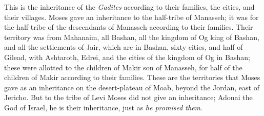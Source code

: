 \begin{biblechapter}
\verse This is the inheritance of the \textit{Gadites} according to their families, the cities, and their villages.
 Moses gave an inheritance to the half-tribe of Manasseh; it was for the half-tribe of the descendants of Manasseh according to their families.
\verse Their territory was from Mahanaim, all Bashan, all the kingdom of Og king of Bashan, and all the settlements of Jair, which are in Bashan, sixty cities,
\verse and half of Gilead, with Ashtaroth, Edrei, and the cities of the kingdom of Og in Bashan; these were allotted to the children of Makir son of Manasseh, for half of the children of Makir according to their families.
\verse These are the territories that Moses gave as an inheritance on the desert-plateau of Moab, beyond the Jordan, east of Jericho.
\verse But to the tribe of Levi Moses did not give an inheritance; Adonai the God of Israel, he is their inheritance, just as \textit{he promised them}.
\end{biblechapter}

